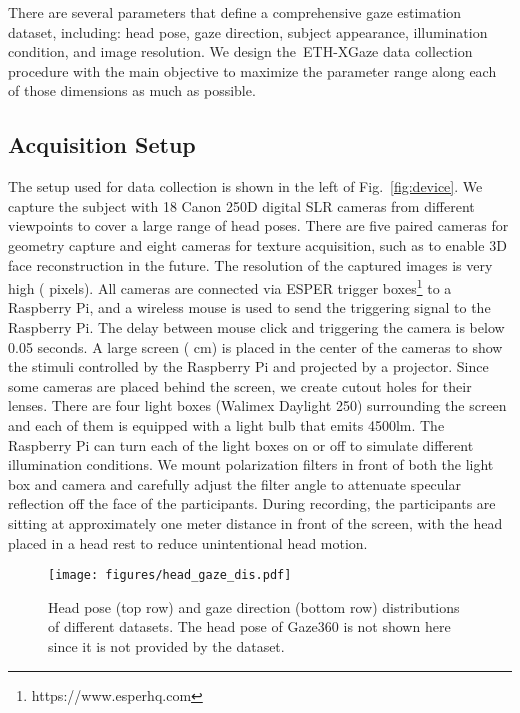 \documentclass[runningheads]{llncs}
\newcommand{\datasetname}{ETH-XGaze\xspace}
\begin{document}
\noindent There are several parameters that define a comprehensive gaze estimation dataset, including: head pose, gaze direction, subject appearance, illumination condition, and image resolution.
We design the~\datasetname data collection procedure with the main objective to maximize the parameter range along each of those dimensions as much as possible.

\subsection{Acquisition Setup}
The setup used for data collection is shown in the left of Fig.~\ref{fig:device}.
We capture the subject with 18 Canon 250D digital SLR cameras from different viewpoints to cover a large range of head poses.
There are five paired cameras for geometry capture and eight cameras for texture acquisition, such as to enable 3D face reconstruction in the future. The resolution of the captured images is very high ( pixels).
All cameras are connected via ESPER trigger boxes\footnote{https://www.esperhq.com} to a Raspberry Pi, and a wireless mouse is used to send the triggering signal to the Raspberry Pi.
The delay between mouse click and triggering the camera is below 0.05 seconds.
A large screen ( cm) is placed in the center of the cameras to show the stimuli controlled by the Raspberry Pi and projected by a projector. Since some cameras are placed behind the screen, we create cutout holes for their lenses. 
There are four light boxes (Walimex Daylight 250) surrounding the screen and each of them is equipped with a light bulb that emits 4500lm.
The Raspberry Pi can turn each of the light boxes on or off to simulate different illumination conditions.
We mount polarization filters in front of both the light box and camera and carefully adjust the filter angle to attenuate specular reflection off the face of the participants.
During recording, the participants are sitting at approximately one meter distance in front of the screen, with the head placed in a head rest to reduce unintentional head motion.

\begin{figure}[t]
    \centering
    \texttt{[image: figures/head\_gaze\_dis.pdf]}
    \caption{Head pose (top row) and gaze direction (bottom row) distributions of different datasets. The head pose of Gaze360 is not shown here since it is not provided by the dataset.}
    \label{fig:head_gaze_dis}
\end{figure}
\end{document}
